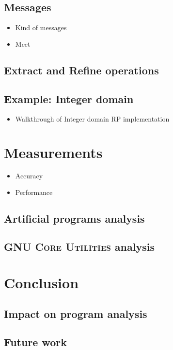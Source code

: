\documentclass[12pt,oneside,draft]{fithesis2}
\begin{document}
\section{Messages}
\begin{itemize}
  \item Kind of messages
  \item Meet
\end{itemize}

\section{Extract and Refine operations}

\section{Example: Integer domain}
\begin{itemize}
  \item Walkthrough of Integer domain RP implementation
\end{itemize}


\chapter{Measurements}
\begin{itemize}
  \item Accuracy
  \item Performance
\end{itemize}
\section{Artificial programs analysis}
\section{\textsc{GNU Core Utilities} analysis}


\chapter{Conclusion}
\section{Impact on program analysis}
\section{Future work}


\end{document}
